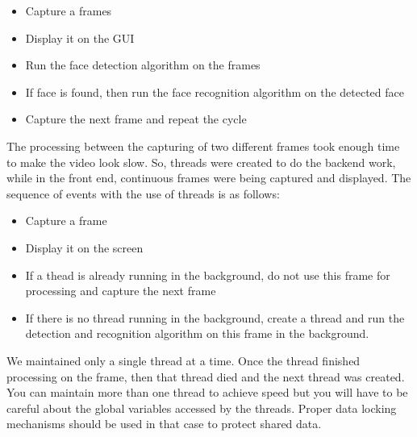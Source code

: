 \documentclass[a4paper,12pt]{article}
\begin{document}
\begin{itemize}
 \item Capture a frames
 \item Display it on the GUI
 \item Run the face detection algorithm on the frames
 \item If face is found, then run the face recognition algorithm on the detected face
 \item Capture the next frame and repeat the cycle
\end{itemize}

The processing between the capturing of two different frames took enough time to make the video look slow. So, threads were created 
to do the backend work, while in the front end, continuous frames were being captured and displayed. The sequence of events with the 
use of threads is as follows:

\begin{itemize}
 \item Capture a frame
 \item Display it on the screen
 \item If a thead is already running in the background, do not use this frame for processing and capture the next frame
 \item If there is no thread running in the background, create a thread and run the detection and recognition algorithm on 
  this frame in the background.
\end{itemize}

We maintained only a single thread at a time. Once the thread finished processing on the frame, then that thread died and the next
thread was created. You can maintain more than one thread to achieve speed but you will have to be careful about the global variables 
accessed by the threads. Proper data locking mechanisms should be used in that case to protect shared data.

\newpage
\end{document}
